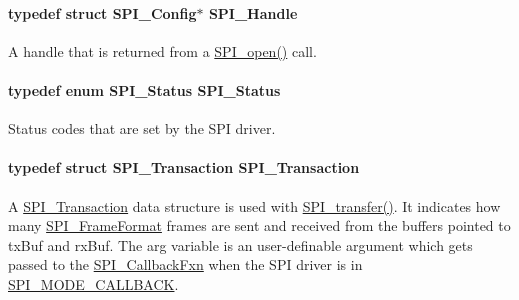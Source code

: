 \paragraph[{S\+P\+I\+\_\+\+Handle}]{\setlength{\rightskip}{0pt plus 5cm}typedef struct {\bf S\+P\+I\+\_\+\+Config}$\ast$ {\bf S\+P\+I\+\_\+\+Handle}}\label{_s_p_i_8h_a728806534c3c3e8675cfbfb7d8e36f13}


A handle that is returned from a \hyperlink{_s_p_i_8h_a62cfe494cb1df47cd602e8747e894fd1}{S\+P\+I\+\_\+open()} call. 

\paragraph[{S\+P\+I\+\_\+\+Status}]{\setlength{\rightskip}{0pt plus 5cm}typedef enum {\bf S\+P\+I\+\_\+\+Status}  {\bf S\+P\+I\+\_\+\+Status}}\label{_s_p_i_8h_adf1c6e6f919dd9f6887da6590a52fd6a}


Status codes that are set by the S\+P\+I driver. 

\paragraph[{S\+P\+I\+\_\+\+Transaction}]{\setlength{\rightskip}{0pt plus 5cm}typedef struct {\bf S\+P\+I\+\_\+\+Transaction}  {\bf S\+P\+I\+\_\+\+Transaction}}\label{_s_p_i_8h_a906af7b4126dcfc52dfa905eb08408fc}


A \hyperlink{struct_s_p_i___transaction}{S\+P\+I\+\_\+\+Transaction} data structure is used with \hyperlink{_s_p_i_8h_a989e17f96b54fcc3dc2cac5f8ac6bdb2}{S\+P\+I\+\_\+transfer()}. It indicates how many \hyperlink{_s_p_i_8h_a53949638d43ae7bf71b74c2b136ad206}{S\+P\+I\+\_\+\+Frame\+Format} frames are sent and received from the buffers pointed to tx\+Buf and rx\+Buf. The arg variable is an user-\/definable argument which gets passed to the \hyperlink{_s_p_i_8h_a207e2d5a7e7ea5606b6995b6485ca015}{S\+P\+I\+\_\+\+Callback\+Fxn} when the S\+P\+I driver is in \hyperlink{_s_p_i_8h_ab9ea76c6529d6076eee5e1c4a5a92c6fa5631e69925c47a62a261c78ebbda39fb}{S\+P\+I\+\_\+\+M\+O\+D\+E\+\_\+\+C\+A\+L\+L\+B\+A\+C\+K}. 


